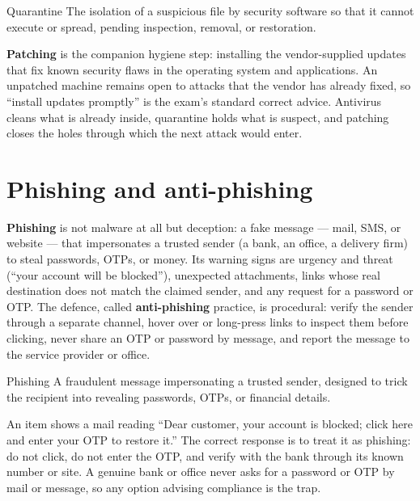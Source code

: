 \begin{definitionbox}{Quarantine}
The isolation of a suspicious file by security software so that it cannot
execute or spread, pending inspection, removal, or restoration.
\end{definitionbox}

\textbf{Patching} is the companion hygiene step: installing the
vendor-supplied updates that fix known security flaws in the operating
system and applications. An unpatched machine remains open to attacks that
the vendor has already fixed, so ``install updates promptly'' is the exam's
standard correct advice. Antivirus cleans what is already inside,
quarantine holds what is suspect, and patching closes the holes through
which the next attack would enter.

\section{Phishing and anti-phishing}
\textbf{Phishing} is not malware at all but deception: a fake message ---
mail, SMS, or website --- that impersonates a trusted sender (a bank, an
office, a delivery firm) to steal passwords, OTPs, or money. Its warning
signs are urgency and threat (``your account will be blocked''), unexpected
attachments, links whose real destination does not match the claimed
sender, and any request for a password or OTP. The defence, called
\textbf{anti-phishing} practice, is procedural: verify the sender through a
separate channel, hover over or long-press links to inspect them before
clicking, never share an OTP or password by message, and report the message
to the service provider or office.

\begin{definitionbox}{Phishing}
A fraudulent message impersonating a trusted sender, designed to trick the
recipient into revealing passwords, OTPs, or financial details.
\end{definitionbox}

\begin{example}
An item shows a mail reading ``Dear customer, your account is blocked;
click here and enter your OTP to restore it.'' The correct response is to
treat it as phishing: do not click, do not enter the OTP, and verify with
the bank through its known number or site. A genuine bank or office never
asks for a password or OTP by mail or message, so any option advising
compliance is the trap.
\end{example}

